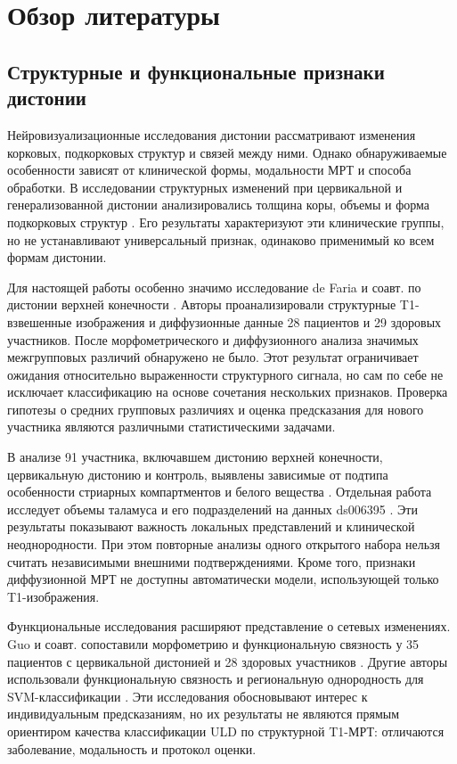 \documentclass[11pt,a4paper]{article}
\begin{document}
\section{Обзор литературы}

\subsection{Структурные и функциональные признаки дистонии}

Нейровизуализационные исследования дистонии рассматривают изменения корковых, подкорковых структур и связей между ними. Однако обнаруживаемые особенности зависят от клинической формы, модальности МРТ и способа обработки. В исследовании структурных изменений при цервикальной и генерализованной дистонии анализировались толщина коры, объемы и форма подкорковых структур \cite{ref05}. Его результаты характеризуют эти клинические группы, но не устанавливают универсальный признак, одинаково применимый ко всем формам дистонии.

Для настоящей работы особенно значимо исследование de Faria и соавт. по дистонии верхней конечности \cite{ref01}. Авторы проанализировали структурные T1-взвешенные изображения и диффузионные данные 28 пациентов и 29 здоровых участников. После морфометрического и диффузионного анализа значимых межгрупповых различий обнаружено не было. Этот результат ограничивает ожидания относительно выраженности структурного сигнала, но сам по себе не исключает классификацию на основе сочетания нескольких признаков. Проверка гипотезы о средних групповых различиях и оценка предсказания для нового участника являются различными статистическими задачами.

В анализе 91 участника, включавшем дистонию верхней конечности, цервикальную дистонию и контроль, выявлены зависимые от подтипа особенности стриарных компартментов и белого вещества \cite{ref03}. Отдельная работа исследует объемы таламуса и его подразделений на данных ds006395 \cite{ref04}. Эти результаты показывают важность локальных представлений и клинической неоднородности. При этом повторные анализы одного открытого набора нельзя считать независимыми внешними подтверждениями. Кроме того, признаки диффузионной МРТ не доступны автоматически модели, использующей только T1-изображения.

Функциональные исследования расширяют представление о сетевых изменениях. Guo и соавт. сопоставили морфометрию и функциональную связность у 35 пациентов с цервикальной дистонией и 28 здоровых участников \cite{ref02}. Другие авторы использовали функциональную связность и региональную однородность для SVM-классификации \cite{ref07,ref08}. Эти исследования обосновывают интерес к индивидуальным предсказаниям, но их результаты не являются прямым ориентиром качества классификации ULD по структурной T1-МРТ: отличаются заболевание, модальность и протокол оценки.
\end{document}

